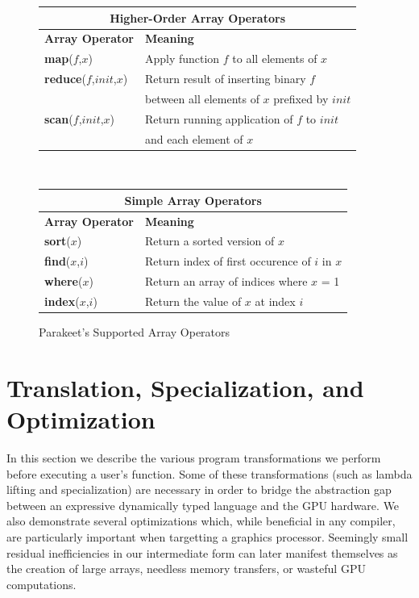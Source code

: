 \documentclass[preprint]{sigplanconf}
\begin{document}
\begin{figure}
\begin{center}
\begin{tabular}{|p{2.25cm}|p{5.5cm}|}
\hline
\multicolumn{2}{|c|}{\textbf{Higher-Order Array Operators}}\\[4pt] \hline
\textbf{Array Operator} & \textbf{Meaning}\\[4pt] \hline
\textbf{map}($f$,$x$) & Apply function $f$ to all elements of $x$\\[4pt] \hline
\textbf{reduce}($f$,$init$,$x$) & Return result of inserting binary $f$ \\
& between all elements of $x$ prefixed by $init$\\[4pt] \hline
\textbf{scan}($f$,$init$,$x$) & Return running application of $f$ to $init$ \\
& and each element of $x$\\[4pt] \hline
\end{tabular}
\\[12pt]
\begin{tabular}{|p{2.25cm}|p{5.5cm}|}
\hline
\multicolumn{2}{|c|}{\textbf{Simple Array Operators}}\\[4pt] \hline
\textbf{Array Operator} & \textbf{Meaning}\\[4pt] \hline
\textbf{sort}($x$) & Return a sorted version of $x$\\[4pt] \hline
\textbf{find}($x$,$i$) & Return index of first occurence of $i$ in
$x$\\[4pt] \hline
\textbf{where}($x$) & Return an array of indices where $x$ = 1\\[4pt] \hline
\textbf{index}($x$,$i$) & Return the value of $x$ at index $i$\\[4pt] \hline

\end{tabular}
\caption{Parakeet's Supported Array Operators}
\label{ArrayOps}
\end{center}
\end{figure}

\section{Translation, Specialization, and Optimization}
\label{Compilation}
In this section we describe the various program transformations we perform
before executing a user's function. Some of these transformations (such as
lambda lifting and specialization) are necessary in order to bridge the
abstraction gap between an expressive dynamically typed language and the GPU
hardware. We also demonstrate several optimizations which, while beneficial in
any compiler, are particularly important when targetting a graphics processor.
Seemingly small residual inefficiencies in our intermediate form can later
manifest themselves as the creation of large arrays, needless memory transfers,
or wasteful GPU computations.
\end{document}
